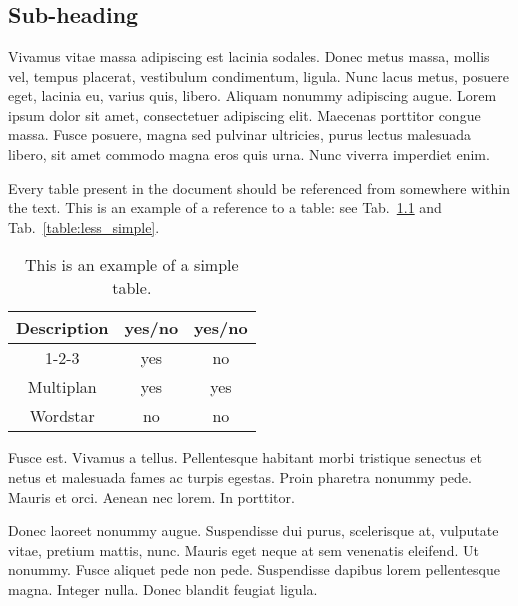 \chapter{}

\section{Sub-heading}

Vivamus vitae massa adipiscing est lacinia sodales. Donec metus massa, mollis vel, tempus placerat, vestibulum condimentum, ligula. Nunc lacus metus, posuere eget, lacinia eu, varius quis, libero. Aliquam nonummy adipiscing augue. Lorem ipsum dolor sit amet, consectetuer adipiscing elit. Maecenas porttitor congue massa. Fusce posuere, magna sed pulvinar ultricies, purus lectus malesuada libero, sit amet commodo magna eros quis urna. Nunc viverra imperdiet enim.

Every table present in the document should be referenced from somewhere within the text. This is an example of a reference to a table: see Tab.~\ref{table:simple} and Tab.~\ref{table:less_simple}.

\begin{table}
\centering
\begin{tabular}{|c|c|c|}
    \hline
    Description & yes/no & yes/no\\
\hline
1-2-3 & yes & no \\
\hline
Multiplan & yes & yes \\
\hline
Wordstar & no & no \\
\hline
\end{tabular}
\caption{This is an example of a simple table.}
\label{table:simple}
\end{table}

Fusce est. Vivamus a tellus. Pellentesque habitant morbi tristique senectus et netus et malesuada fames ac turpis egestas. Proin pharetra nonummy pede. Mauris et orci. Aenean nec lorem. In porttitor.\par

Donec laoreet nonummy augue. Suspendisse dui purus, scelerisque at, vulputate vitae, pretium mattis, nunc. Mauris eget neque at sem venenatis eleifend. Ut nonummy. Fusce aliquet pede non pede. Suspendisse dapibus lorem pellentesque magna. Integer nulla. Donec blandit feugiat ligula.\par


